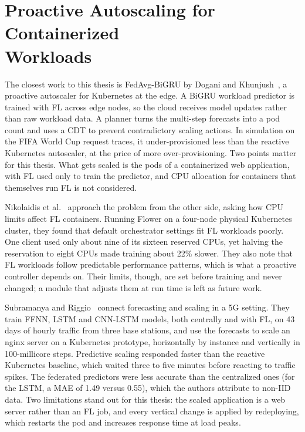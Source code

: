 \section[Proactive Autoscaling for Containerized Workloads]{Proactive Autoscaling for Containerized\\Workloads}\label{sec:lit-autoscaling}

The closest work to this thesis is FedAvg-BiGRU by Dogani and Khunjush~\cite{dogani2024}, a proactive autoscaler for Kubernetes at the edge. A \ac{BiGRU} workload predictor is trained with \ac{FL} across edge nodes, so the cloud receives model updates rather than raw workload data. A planner turns the multi-step forecasts into a pod count and uses a \ac{CDT} to prevent contradictory scaling actions. In simulation on the FIFA World Cup request traces, it under-provisioned less than the reactive Kubernetes autoscaler, at the price of more over-provisioning. Two points matter for this thesis. What gets scaled is the pods of a containerized web application, with \ac{FL} used only to train the predictor, and \ac{CPU} allocation for containers that themselves run \ac{FL} is not considered.

Nikolaidis et al.~\cite{nikolaidis2023} approach the problem from the other side, asking how \ac{CPU} limits affect \ac{FL} containers. Running Flower on a four-node physical Kubernetes cluster, they found that default orchestrator settings fit \ac{FL} workloads poorly. One client used only about nine of its sixteen reserved CPUs, yet halving the reservation to eight CPUs made training about 22\% slower. They also note that \ac{FL} workloads follow predictable performance patterns, which is what a proactive controller depends on. Their limits, though, are set before training and never changed; a module that adjusts them at run time is left as future work.

Subramanya and Riggio~\cite{subramanya2021} connect forecasting and scaling in a 5G setting. They train \ac{FFNN}, \ac{LSTM} and \ac{CNN-LSTM} models, both centrally and with \ac{FL}, on 43 days of hourly traffic from three base stations, and use the forecasts to scale an nginx server on a Kubernetes prototype, horizontally by instance and vertically in 100-millicore steps. Predictive scaling responded faster than the reactive Kubernetes baseline, which waited three to five minutes before reacting to traffic spikes. The federated predictors were less accurate than the centralized ones (for the \ac{LSTM}, a \ac{MAE} of 1.49 versus 0.55), which the authors attribute to non-\ac{IID} data. Two limitations stand out for this thesis: the scaled application is a web server rather than an \ac{FL} job, and every vertical change is applied by redeploying, which restarts the pod and increases response time at load peaks.

